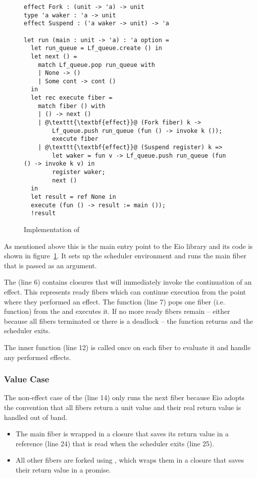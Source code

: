 \subsubsection{}
\label{sec:sched-impl-run}

\begin{figure}[ht]
  \begin{verbatim}
effect Fork : (unit -> 'a) -> unit
type 'a waker : 'a -> unit
effect Suspend : ('a waker -> unit) -> 'a

let run (main : unit -> 'a) : 'a option =
  let run_queue = Lf_queue.create () in
  let next () =
    match Lf_queue.pop run_queue with
    | None -> ()
    | Some cont -> cont () 
  in
  let rec execute fiber =
    match fiber () with
    | () -> next ()
    | @\texttt{\textbf{effect}}@ (Fork fiber) k ->
        Lf_queue.push run_queue (fun () -> invoke k ());
        execute fiber
    | @\texttt{\textbf{effect}}@ (Suspend register) k =>
        let waker = fun v -> Lf_queue.push run_queue (fun () -> invoke k v) in
        register waker;
        next ()
  in
  let result = ref None in
  execute (fun () -> result := main ());
  !result
  \end{verbatim}
  \caption{Implementation of }
  \label{fig:sched-impl-run}
\end{figure}

As mentioned above this is the main entry point to the Eio library and its code is shown in figure~\ref{fig:sched-impl-run}.
It sets up the scheduler environment and runs the main fiber that is passed as an argument.

The  (line 6) contains closures that will immediately invoke the continuation of an effect.
This represents ready fibers which can continue execution from the point where they performed an effect.
The  function (line 7) pops one fiber (i.e. function) from the  and executes it.
If no more ready fibers remain -- either because all fibers terminated or there is a deadlock -- the  function returns and the scheduler exits.

The inner  function (line 12) is called once on each fiber to evaluate it and handle any performed effects.
\subsubsection*{Value Case}
The non-effect case of the  (line 14) only runs the next fiber because Eio adopts the convention that all fibers return a unit value and their real return value is handled out of band.
\begin{itemize}
  \item The main fiber is wrapped in a closure that saves its return value in a reference (line 24) that is read when the scheduler exits (line 25).
  \item All other fibers are forked using , which wraps them in a closure that saves their return value in a promise.
\end{itemize}

